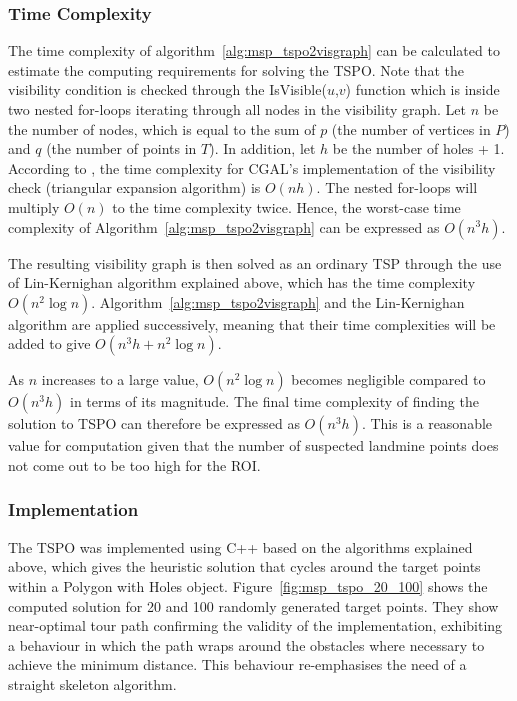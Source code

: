 \subsubsection{Time Complexity}

The time complexity of algorithm~\ref{alg:msp_tspo2visgraph} can be calculated to estimate the computing requirements for solving the \gls{TSPO}. Note that the visibility condition is checked through the IsVisible($u$,$v$) function which is inside two nested for-loops iterating through all nodes in the visibility graph. Let $n$ be the number of nodes, which is equal to the sum of $p$ (the number of vertices in $P$) and $q$ (the number of points in $T$). In addition, let $h$ be the number of holes + 1. According to \cite{cgal2024visibility}, the time complexity for \gls{CGAL}'s implementation of the visibility check (triangular expansion algorithm) is $O(n h)$. The nested for-loops will multiply $O(n)$ to the time complexity twice. Hence, the worst-case time complexity of Algorithm~\ref{alg:msp_tspo2visgraph} can be expressed as $O(n^3 h)$. 

The resulting visibility graph is then solved as an ordinary \gls{TSP} through the use of Lin-Kernighan algorithm explained above, which has the time complexity $O(n^2\log{n})$. Algorithm~\ref{alg:msp_tspo2visgraph} and the Lin-Kernighan algorithm are applied successively, meaning that their time complexities will be added to give $O(n^3 h + n^2\log{n})$. 

As $n$ increases to a large value, $O(n^2\log{n})$ becomes negligible compared to $O(n^3 h)$ in terms of its magnitude. The final time complexity of finding the solution to \gls{TSPO} can therefore be expressed as $O(n^3 h)$. This is a reasonable value for computation given that the number of suspected landmine points does not come out to be too high for the \gls{ROI}. 


\subsubsection{Implementation}

The \gls{TSPO} was implemented using C++ based on the algorithms explained above, which gives the heuristic solution that cycles around the target points within a Polygon with Holes object. Figure~\ref{fig:msp_tspo_20_100} shows the computed solution for 20 and 100 randomly generated target points. They show near-optimal tour path confirming the validity of the implementation, exhibiting a behaviour in which the path wraps around the obstacles where necessary to achieve the minimum distance. This behaviour re-emphasises the need of a straight skeleton algorithm. 

